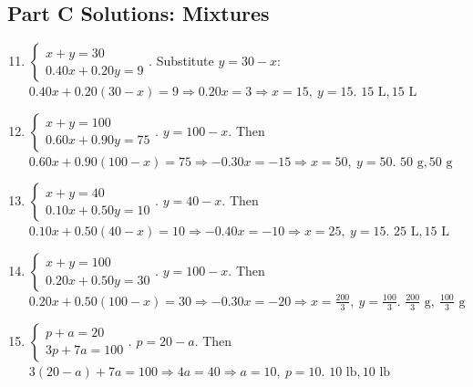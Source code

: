 \documentclass[12pt]{article}
\begin{document}
\subsection*{Part C Solutions: Mixtures}
\begin{enumerate}
  \setcounter{enumi}{10}
  \item \(\begin{cases} x+y=30 \\ 0.40x+0.20y=9 \end{cases}\).  
  Substitute \(y=30-x\): \(0.40x+0.20(30-x)=9 \Rightarrow 0.20x=3 \Rightarrow x=15,\ y=15\). \(\boxed{15\text{ L},15\text{ L}}\)

  \item \(\begin{cases} x+y=100 \\ 0.60x+0.90y=75 \end{cases}\).  
  \(y=100-x\). Then \(0.60x+0.90(100-x)=75 \Rightarrow -0.30x=-15 \Rightarrow x=50,\ y=50\). \(\boxed{50\text{ g},50\text{ g}}\)

  \item \(\begin{cases} x+y=40 \\ 0.10x+0.50y=10 \end{cases}\).  
  \(y=40-x\). Then \(0.10x+0.50(40-x)=10 \Rightarrow -0.40x=-10 \Rightarrow x=25,\ y=15\). \(\boxed{25\text{ L},15\text{ L}}\)

  \item \(\begin{cases} x+y=100 \\ 0.20x+0.50y=30 \end{cases}\).  
  \(y=100-x\). Then \(0.20x+0.50(100-x)=30 \Rightarrow -0.30x=-20 \Rightarrow x=\frac{200}{3},\ y=\frac{100}{3}\).  
  \(\boxed{\tfrac{200}{3}\text{ g},\ \tfrac{100}{3}\text{ g}}\)

  \item \(\begin{cases} p+a=20 \\ 3p+7a=100 \end{cases}\).  
  \(p=20-a\). Then \(3(20-a)+7a=100 \Rightarrow 4a=40 \Rightarrow a=10,\ p=10\). \(\boxed{10\text{ lb},10\text{ lb}}\)
\end{enumerate}
\end{document}
